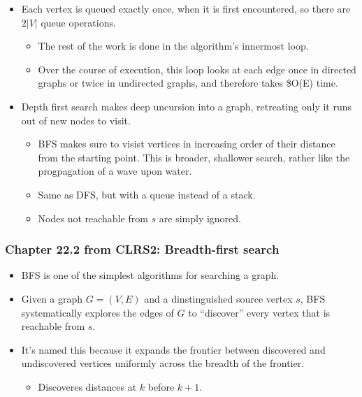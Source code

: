 \documentclass[a4paper,11pt]{article}
\begin{document}
\begin{itemize}
\itemsep1pt\parskip0pt
\item
  Each vertex is queued exactly once, when it is first encountered, so
  there are $2 |V|$ queue operations.

  \begin{itemize}
  \itemsep1pt\parskip0pt
  \item
    The rest of the work is done in the algorithm's innermost loop.
  \item
    Over the course of execution, this loop looks at each edge once in
    directed graphs or twice in undirected graphs, and therefore takes
    \$O(\textbar{}E\textbar{}) time.
  \end{itemize}
\item
  Depth first search makes deep uncursion into a graph, retreating only
  it runs out of new nodes to visit.

  \begin{itemize}
  \itemsep1pt\parskip0pt
  \item
    BFS makes sure to visist vertices in increasing order of their
    distance from the starting point. This is broader, shallower search,
    rather like the progpagation of a wave upon water.
  \item
    Same as DFS, but with a queue instead of a stack.
  \item
    Nodes not reachable from $s$ are simply ignored.
  \end{itemize}
\end{itemize}

\subsubsection{Chapter 22.2 from CLRS2: Breadth-first
search}\label{chapter-22.2-from-clrs2-breadth-first-search}

\begin{itemize}
\itemsep1pt\parskip0pt
\item
  BFS is one of the simplest algorithms for searching a graph.
\item
  Given a graph $G = (V, E)$ and a dinstinguished source vertex $s$, BFS
  systematically explores the edges of $G$ to ``discover'' every vertex
  that is reachable from $s$.
\item
  It's named this because it expands the frontier between discovered and
  undiscovered vertices uniformly across the breadth of the frontier.

  \begin{itemize}
  \itemsep1pt\parskip0pt
  \item
    Discoveres distances at $k$ before $k + 1$.
  \end{itemize}
\end{itemize}
\end{document}
